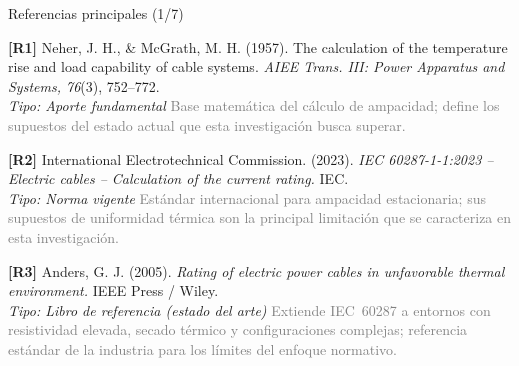 \documentclass[aspectratio=169]{beamer}
\begin{document}
\begin{frame}{Referencias principales (1/7)}
\small\justifying

\textbf{[R1]} Neher, J. H., \& McGrath, M. H. (1957). The calculation of the
temperature rise and load capability of cable systems. \textit{AIEE Trans.
III: Power Apparatus and Systems, 76}(3), 752--772.\\
\textcolor{blue!60!black}{\footnotesize\textit{Tipo: Aporte fundamental}} \quad
\textcolor{gray}{\footnotesize Base matemática del cálculo de ampacidad; define
los supuestos del estado actual que esta investigación busca superar.}

\medskip
\textbf{[R2]} International Electrotechnical Commission. (2023). \textit{IEC
60287-1-1:2023 -- Electric cables -- Calculation of the current rating.} IEC.\\
\textcolor{blue!60!black}{\footnotesize\textit{Tipo: Norma vigente}} \quad
\textcolor{gray}{\footnotesize Estándar internacional para ampacidad estacionaria;
sus supuestos de uniformidad térmica son la principal limitación que se
caracteriza en esta investigación.}

\medskip
\textbf{[R3]} Anders, G. J. (2005). \textit{Rating of electric power cables in
unfavorable thermal environment.} IEEE Press / Wiley.\\
\textcolor{blue!60!black}{\footnotesize\textit{Tipo: Libro de referencia (estado del arte)}} \quad
\textcolor{gray}{\footnotesize Extiende IEC~60287 a entornos con resistividad
elevada, secado térmico y configuraciones complejas; referencia estándar de la
industria para los límites del enfoque normativo.}
\end{frame}
\end{document}

